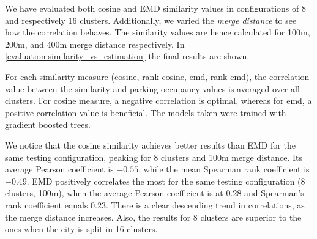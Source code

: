 We have evaluated both cosine and EMD similarity values in configurations of 8 and respectively 16 clusters.
Additionally, we varied the \textit{merge distance} to see how the correlation behaves.
The similarity values are hence calculated for 100m, 200m, and 400m merge distance respectively.
In \autoref{evaluation:similarity_vs_estimation} the final results are shown.
{\color{orange}For each similarity measure (cosine, rank cosine, emd, rank emd), the correlation value between the similarity and parking occupancy values is averaged over all clusters. For cosine measure, a negative correlation is optimal, whereas for emd, a positive correlation value is beneficial. The models taken were trained with gradient boosted trees. 

We notice that the cosine similarity achieves better results than EMD for the same testing configuration, peaking for 8 clusters and 100m merge distance.
Its average Pearson coefficient is $-0.55$, while the mean Spearman rank coefficient is $-0.49$.
EMD positively correlates the most for the same testing configuration (8 clusters, 100m), when the average Pearson coefficient is at $0.28$ and Spearman's rank coefficient equals $0.23$.
There is a clear descending trend in correlations, as the merge distance increases.  Also, the results for 8 clusters are superior to the ones when the city is split in 16 clusters.}

